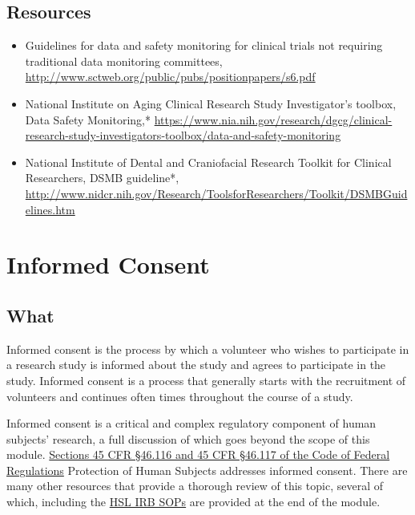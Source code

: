 \documentclass[]{book}
\providecommand{\tightlist}{%
  \setlength{\itemsep}{0pt}\setlength{\parskip}{0pt}}
\begin{document}
\subsection{Resources}\label{resources-8}

\begin{itemize}
\tightlist
\item
  Guidelines for data and safety monitoring for clinical trials not
  requiring traditional data monitoring committees,
  \url{http://www.sctweb.org/public/pubs/positionpapers/s6.pdf}
\item
  National Institute on Aging Clinical Research Study Investigator's
  toolbox, Data Safety Monitoring,*
  \url{https://www.nia.nih.gov/research/dgcg/clinical-research-study-investigators-toolbox/data-and-safety-monitoring}
\item
  National Institute of Dental and Craniofacial Research Toolkit for
  Clinical Researchers, DSMB guideline*,
  \url{http://www.nidcr.nih.gov/Research/ToolsforResearchers/Toolkit/DSMBGuidelines.htm}
\end{itemize}

\section{Informed Consent}\label{informed-consent}

\subsection{What}\label{what-10}

Informed consent is the process by which a volunteer who wishes to
participate in a research study is informed about the study and agrees
to participate in the study. Informed consent is a process that
generally starts with the recruitment of volunteers and continues often
times throughout the course of a study.

Informed consent is a critical and complex regulatory component of human
subjects' research, a full discussion of which goes beyond the scope of
this module.
\href{http://www.hhs.gov/ohrp/regulations-and-policy/regulations/45-cfr-46/index.html}{Sections
45 CFR §46.116 and 45 CFR §46.117 of the Code of Federal Regulations}
Protection of Human Subjects addresses informed consent. There are many
other resources that provide a thorough review of this topic, several of
which, including the
\href{http://thehslhub/~/media/HSLNet/Docs/IFAR/IRB/IRB_SOP.ashx}{HSL
IRB SOPs} are provided at the end of the module.
\end{document}
